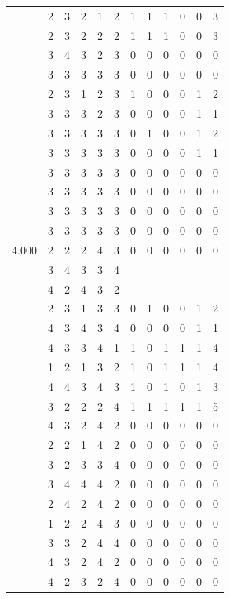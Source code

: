 \documentclass[]{msu-thesis}
\theoremstyle{definition}
\theoremstyle{definition}
\theoremstyle{definition}
\theoremstyle{remark}
\begin{document}
\begin{table}
{\begin{tabular}[t]{rrrrrrrrrrrr}
 & 2 & 3 & 2 & 1 & 2 & 1 & 1 & 1 & 0 & 0 & 3\\
 & 2 & 3 & 2 & 2 & 2 & 1 & 1 & 1 & 0 & 0 & 3\\
 & 3 & 4 & 3 & 2 & 3 & 0 & 0 & 0 & 0 & 0 & 0\\
 & 3 & 3 & 3 & 3 & 3 & 0 & 0 & 0 & 0 & 0 & 0\\
 & 2 & 3 & 1 & 2 & 3 & 1 & 0 & 0 & 0 & 1 & 2\\
 & 3 & 3 & 3 & 2 & 3 & 0 & 0 & 0 & 0 & 1 & 1\\
 & 3 & 3 & 3 & 3 & 3 & 0 & 1 & 0 & 0 & 1 & 2\\
 & 3 & 3 & 3 & 3 & 3 & 0 & 0 & 0 & 0 & 1 & 1\\
 & 3 & 3 & 3 & 3 & 3 & 0 & 0 & 0 & 0 & 0 & 0\\
 & 3 & 3 & 3 & 3 & 3 & 0 & 0 & 0 & 0 & 0 & 0\\
 & 3 & 3 & 3 & 3 & 3 & 0 & 0 & 0 & 0 & 0 & 0\\
 & 3 & 3 & 3 & 3 & 3 & 0 & 0 & 0 & 0 & 0 & 0\\
4.000 & 2 & 2 & 2 & 4 & 3 & 0 & 0 & 0 & 0 & 0 & 0\\
 & 3 & 4 & 3 & 3 & 4 &  &  &  &  &  & \\
 & 4 & 2 & 4 & 3 & 2 &  &  &  &  &  & \\
 & 2 & 3 & 1 & 3 & 3 & 0 & 1 & 0 & 0 & 1 & 2\\
 & 4 & 3 & 4 & 3 & 4 & 0 & 0 & 0 & 0 & 1 & 1\\
 & 4 & 3 & 3 & 4 & 1 & 1 & 0 & 1 & 1 & 1 & 4\\
 & 1 & 2 & 1 & 3 & 2 & 1 & 0 & 1 & 1 & 1 & 4\\
 & 4 & 4 & 3 & 4 & 3 & 1 & 0 & 1 & 0 & 1 & 3\\
 & 3 & 2 & 2 & 2 & 4 & 1 & 1 & 1 & 1 & 1 & 5\\
 & 4 & 3 & 2 & 4 & 2 & 0 & 0 & 0 & 0 & 0 & 0\\
 & 2 & 2 & 1 & 4 & 2 & 0 & 0 & 0 & 0 & 0 & 0\\
 & 3 & 2 & 3 & 3 & 4 & 0 & 0 & 0 & 0 & 0 & 0\\
 & 3 & 4 & 4 & 4 & 2 & 0 & 0 & 0 & 0 & 0 & 0\\
 & 2 & 4 & 2 & 4 & 2 & 0 & 0 & 0 & 0 & 0 & 0\\
 & 1 & 2 & 2 & 4 & 3 & 0 & 0 & 0 & 0 & 0 & 0\\
 & 3 & 3 & 2 & 4 & 4 & 0 & 0 & 0 & 0 & 0 & 0\\
 & 4 & 3 & 2 & 4 & 2 & 0 & 0 & 0 & 0 & 0 & 0\\
 & 4 & 2 & 3 & 2 & 4 & 0 & 0 & 0 & 0 & 0 & 0\\

\end{tabular}}
\end{table}
\end{document}
